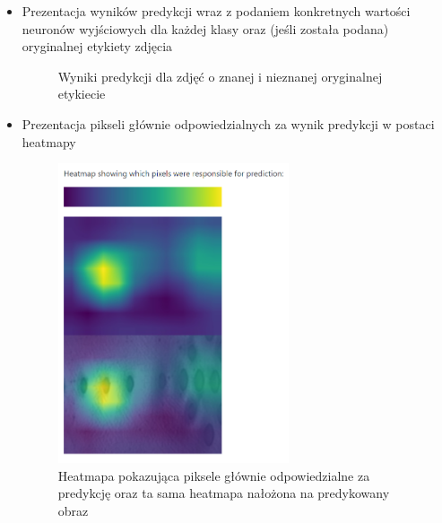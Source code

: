 \documentclass[polish,12pt]{aghthesis}
\begin{document}
\begin{itemize}
    \item  Prezentacja wyników predykcji wraz z podaniem konkretnych wartości neuronów wyjściowych dla każdej klasy oraz (jeśli została podana) oryginalnej etykiety zdjęcia
    
    \begin{figure}[H]
    \begin{adjustbox}{minipage=1.0\paperwidth, pagecenter}
    \centering
    \qquad
    \end{adjustbox}
    \caption{Wyniki predykcji dla zdjęć o znanej i nieznanej oryginalnej etykiecie}
    \end{figure}
    
    \item Prezentacja pikseli głównie odpowiedzialnych za wynik predykcji w postaci heatmapy
    
    \begin{figure}[H]%
    \centering
    \includegraphics[width=6.8cm]{images/heatmapa.PNG}
    \caption{Heatmapa pokazująca piksele głównie odpowiedzialne za predykcję oraz ta sama heatmapa nałożona na predykowany obraz}
    \end{figure}
    
\end{itemize}
\end{document}
